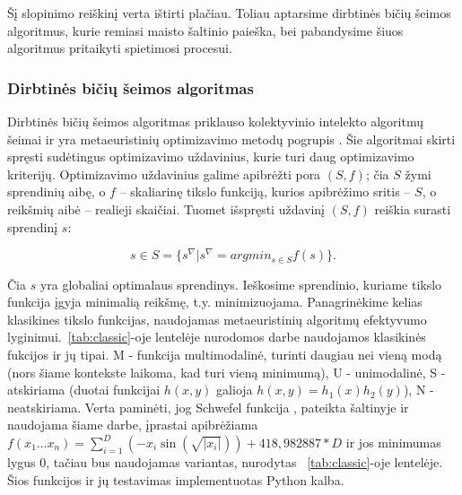 \documentclass{VUMIFPSmagistrinis}
\begin{document}
 Šį slopinimo reiškinį verta ištirti plačiau. Toliau aptarsime dirbtinės bičių šeimos algoritmus, kurie remiasi maisto šaltinio paieška, bei pabandysime šiuos algoritmus pritaikyti spietimosi procesui.


\subsubsection{Dirbtinės bičių šeimos algoritmas}



Dirbtinės bičių šeimos algoritmas \cite{KaB07} priklauso kolektyvinio intelekto algoritmų šeimai ir yra metaeuristinių optimizavimo metodų pogrupis \cite{MBB11}.
Šie algoritmai skirti spręsti sudėtingus optimizavimo uždavinius, kurie turi daug optimizavimo kriterijų.
Optimizavimo uždavinius galime apibrėžti pora $(S, f)$; čia $S$ žymi sprendinių aibę, o $f$ – skaliarinę tikslo funkciją, kurios apibrėžimo sritis – $S$, o reikšmių aibė – realieji skaičiai. Tuomet išspręsti uždavinį $(S, f)$ reiškia surasti sprendinį $s$:

\begin{equation}\label{sol}
s \in  S = \{s^{\nabla} | s^{\nabla} = argmin_{s \in S} f(s)\}.
\end{equation}

Čia $s$ yra globaliai optimalaus sprendinys. Ieškosime sprendinio, kuriame tikslo funkcija įgyja minimalią reikšmę, t.y. minimizuojama. Panagrinėkime kelias klasikines tikslo funkcijas, naudojamas metaeuristinių algoritmų efektyvumo lyginimui.~\ref{tab:classic}-oje lentelėje nurodomos darbe naudojamos klasikinės fukcijos ir jų tipai. M - funkcija multimodalinė, turinti daugiau nei vieną modą (nors šiame kontekste laikoma, kad turi vieną minimumą), U - unimodalinė, S - atskiriama (duotai funkcijai $h(x,y)$ galioja $h(x,y)=h_{1}(x)h_{2}(y)$), N - neatskiriama. Verta paminėti, jog Schwefel funkcija \cite{Sch81}, pateikta \cite{ABK19} šaltinyje ir naudojama šiame darbe, įprastai apibrėžiama $f(x_{1}\dots x_{n}) = \sum_{i=1}^{D} (-x_{i}\sin{(\sqrt{|x_{i}|})}) + 418,982887 * D$ ir jos minimumas lygus 0, tačiau bus naudojamas variantas, nurodytas ~\ref{tab:classic}-oje lentelėje. Šios funkcijos ir jų testavimas implementuotas Python kalba. 
\end{document}
